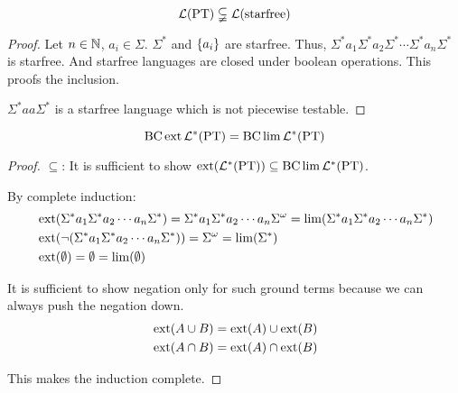 \begin{lemma}
\[\mathcal{L}(\textup{\textrm{PT}}) \subsetneqq \mathcal{L}(\textup{\textrm{starfree}})\]
\begin{proof}
Let $n\in\mathbb{N}$, $a_i \in \Sigma$. $\Sigma^*$ and $\Set{a_i}$ are starfree. Thus, $\Sigma^* a_1 \Sigma^* a_2 \Sigma^* \cdots\Sigma^* a_n \Sigma^*$ is starfree. And starfree languages are closed under boolean operations. This proofs the inclusion.

$\Sigma^* aa \Sigma^*$ is a starfree language which is not piecewise testable.
\end{proof}
\end{lemma}


\begin{theorem}
\label{thm.PT}
\[ \operatorname{BC} \operatorname{ext} \mathcal{L}^* (\textup{\textrm{PT}}) = \operatorname{BC} \lim \mathcal{L}^* (\textup{\textrm{PT}}) \]
\begin{proof}
$\subseteq$: It is sufficient to show $\operatorname{ext}(\mathcal{L}^* (\textup{\textrm{PT}})) \subseteq \operatorname{BC} \lim \mathcal{L}^* (\textup{\textrm{PT}})$.

By complete induction:
\begin{align*}
& \operatorname{ext}(\Sigma^* a_1 \Sigma^* a_2 \dotsb a_n \Sigma^*) = \Sigma^* a_1 \Sigma^* a_2 \dotsb a_n \Sigma^\omega = \lim(\Sigma^* a_1 \Sigma^* a_2 \dotsb a_n \Sigma^*) \\
& \operatorname{ext}( \neg ( \Sigma^* a_1 \Sigma^* a_2 \dotsb a_n \Sigma^* )) = \Sigma^\omega = \lim( \Sigma^* ) \\
& \operatorname{ext}( \emptyset ) = \emptyset = \lim(\emptyset)
\end{align*}

It is sufficient to show negation only for such ground terms because we can always push the negation down.
\begin{align*}
& \operatorname{ext}(A \cup B) = \operatorname{ext}(A) \cup \operatorname{ext}(B) \\
& \operatorname{ext}(A \cap B) = \operatorname{ext}(A) \cap \operatorname{ext}(B)
\end{align*}

This makes the induction complete.


\end{proof}
\end{theorem}
